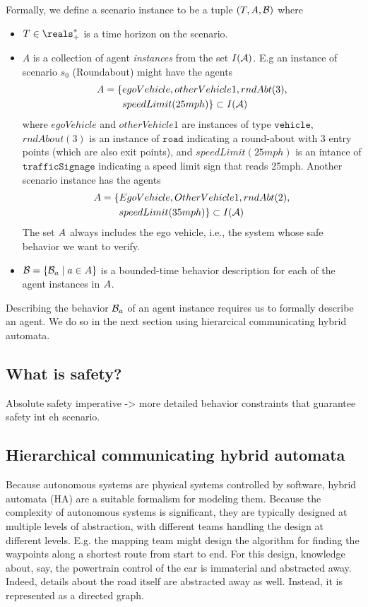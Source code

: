 Formally, we define a scenario instance to be a tuple $(T, A,\mathcal{B})$ where
\begin{itemize}
\item $T \in \preals$ is a time horizon on the scenario.
%
\item $A$ is a collection of agent \emph{instances} from the set $I(\mathcal{A})$.
E.g an instance of scenario $s_0$ (Roundabout) might have the agents 
\begin{eqnarray*}
A = \{&egoVehicle, otherVehicle1, rndAbt(3), \\ 
& speedLimit(25mph)\} \subset I(\mathcal{A})
\end{eqnarray*}
where $egoVehicle$ and $otherVehicle1$ are instances of type $\texttt{vehicle}$, 
$rndAbout(3)$ is an instance of $\texttt{road}$ indicating a round-about with 3 entry points (which are also exit points),
and $speedLimit(25mph)$ is an intance of $\texttt{trafficSignage}$ indicating a speed limit sign that reads 25mph.
Another scenario instance has the agents
\begin{eqnarray*}
A = \{&EgoVehicle, OtherVehicle1, rndAbt(2), \\ 
& speedLimit(35mph)\} \subset I(\mathcal{A})
\end{eqnarray*}
The set $A$ always includes the ego vehicle, i.e., the system whose safe behavior we want to verify.
%
\item $\mathcal{B} = \{\mathcal{B}_a \;|\; a \in A\}$ is a bounded-time behavior description for each of the agent instances in $A$.
\end{itemize}

Describing the behavior $\mathcal{B}_a$ of an agent instance requires us to formally describe an agent. We do so in the next section using hierarcical communicating hybrid automata.

\subsection{What is safety?}
\label{safety}
Absolute safety imperative -> more detailed behavior constraints that guarantee safety int eh scenario.

\subsection{Hierarchical communicating hybrid automata}
Because autonomous systems are physical systems controlled by software, hybrid automata (HA) are a suitable formalism for modeling them.
Because the complexity of autonomous systems is significant, they are typically designed at multiple levels of abstraction, 
with different teams handling the design at different levels.
E.g. the mapping team might design the algorithm for finding the waypoints along a shortest route from start to end.
For this design, knowledge about, say, the powertrain control of the car is immaterial and abstracted away.
Indeed, details about the road itself are abstracted away as well.
Instead, it is represented as a directed graph.

